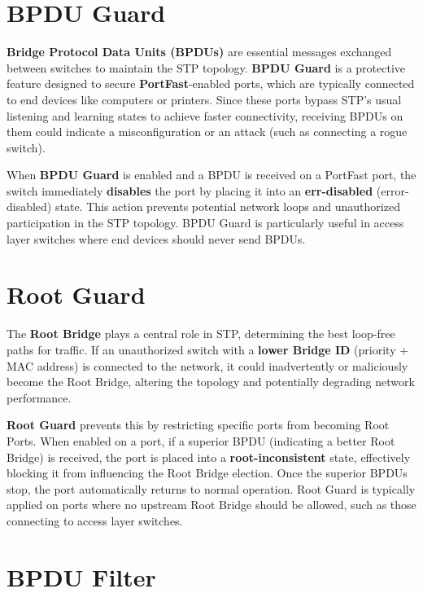 \documentclass[a4paper]{book}
\begin{document}
\section*{BPDU Guard}

\textbf{Bridge Protocol Data Units (BPDUs)} are essential messages exchanged between switches to maintain the STP topology. \textbf{BPDU Guard} is a protective feature designed to secure \textbf{PortFast}-enabled ports, which are typically connected to end devices like computers or printers. Since these ports bypass STP’s usual listening and learning states to achieve faster connectivity, receiving BPDUs on them could indicate a misconfiguration or an attack (such as connecting a rogue switch).

When \textbf{BPDU Guard} is enabled and a BPDU is received on a PortFast port, the switch immediately \textbf{disables} the port by placing it into an \textbf{err-disabled} (error-disabled) state. This action prevents potential network loops and unauthorized participation in the STP topology. BPDU Guard is particularly useful in access layer switches where end devices should never send BPDUs.

\section*{Root Guard}

The \textbf{Root Bridge} plays a central role in STP, determining the best loop-free paths for traffic. If an unauthorized switch with a \textbf{lower Bridge ID} (priority + MAC address) is connected to the network, it could inadvertently or maliciously become the Root Bridge, altering the topology and potentially degrading network performance.

\textbf{Root Guard} prevents this by restricting specific ports from becoming Root Ports. When enabled on a port, if a superior BPDU (indicating a better Root Bridge) is received, the port is placed into a \textbf{root-inconsistent} state, effectively blocking it from influencing the Root Bridge election. Once the superior BPDUs stop, the port automatically returns to normal operation. Root Guard is typically applied on ports where no upstream Root Bridge should be allowed, such as those connecting to access layer switches.

\section*{BPDU Filter}
\end{document}
